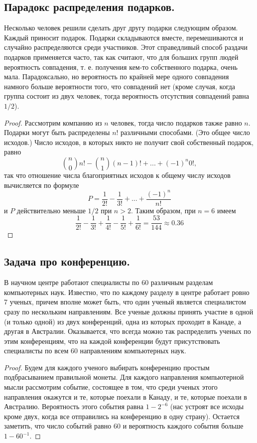 \subsection{Парадокс распределения подарков.}
Несколько человек решили сделать друг другу подарки следующим образом. Каждый приносит подарок. Подарки складываются вместе, перемешиваются и случайно распределяются среди участников. Этот справедливый способ раздачи подарков применяется часто, так как считают, что для больших групп людей вероятность совпадения, т. е. получения кем-то собственного подарка, очень мала. Парадоксально, но вероятность по крайней мере одного совпадения намного больше вероятности того, что совпадений нет (кроме случая, когда группа состоит из двух человек, тогда вероятность отсутствия совпадений равна $1/2$).
\begin{proof}
    Рассмотрим компанию из $n$ человек, тогда число подарков также равно $n$. Подарки могут быть распределены $n!$ различными способами. (Это общее число исходов.) Число исходов, в которых никто не получит свой собственный подарок, равно
    $$\binom{n}{0}n! - \binom{n}{1}(n-1)! + ... + (-1)^n 0!,$$
    так что отношение числа благоприятных исходов к общему числу исходов вычисляется по формуле
    $$P = \frac{1}{2!} - \frac{1}{3!} + ... + \frac{(-1)^n}{n!}$$
    и $P$ действительно меньше $1/2$ при $n > 2$.
    Таким образом, при $n = 6$ имеем
    $$\frac{1}{2!} - \frac{1}{3!} + \frac{1}{4!} - \frac{1}{5!} + \frac{1}{6!} = \frac{53}{144} \approx 0.36$$
\end{proof}
\newpage

\subsection{Задача про конференцию.}
В научном центре работают специалисты по 60 различным разделам компьютерных наук. Известно, что по каждому разделу в центре работает ровно 7 ученых, причем вполне может быть, что один ученый является специалистом сразу по нескольким направлениям. Все ученые должны принять участие в одной (и только одной) из двух конференций, одна из которых проходит в Канаде, а другая в Австралии. Оказывается, что всегда можно так распределить ученых по этим конференциям, что на каждой конференции будут присутствовать специалисты по всем 60 направлениям компьютерных наук.
\begin{proof}
    Будем для каждого ученого выбирать конференцию простым подбрасыванием правильной монеты. Для каждого направления компьютерной мысли рассмотрим событие, состоящее в том, что среди ученых этого направления окажутся и те, которые поехали в Канаду, и те, которые поехали в Австралию. Вероятность этого события равна $1 - 2^{-6}$ (нас устроят все исходы кроме двух, когда все отправились на конференцию в одну страну). Остается заметить, что число событий равно 60 и вероятность каждого события больше $1 - 60^{-1}$.
\end{proof}